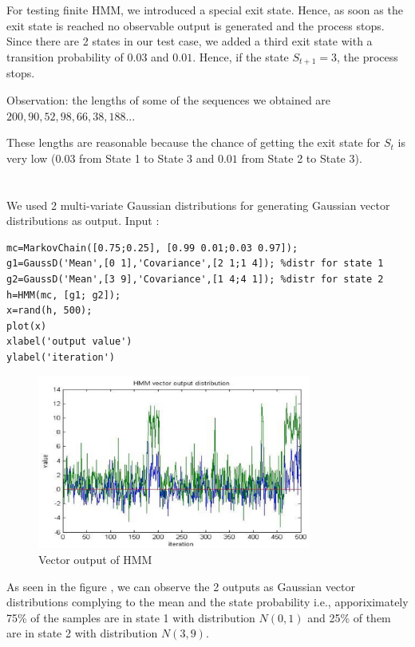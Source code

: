 \section{} %
For testing finite HMM, we introduced a special exit state. Hence, as soon as the exit state is reached no observable output is generated and the process stops. Since there are 2 states in our test case, we added a third exit state with a transition probability of $0.03$ and $0.01$. Hence, if the state $S_{t+1} = 3$, the process stops.

Observation: the lengths of some of the sequences we obtained are $200, 90, 52, 98, 66, 38, 188$...

These lengths are reasonable because the chance of getting the exit state for $S_t$ is very low ($0.03$ from State 1 to State 3 and $0.01$ from State 2 to State 3).

\section{} %
We used 2 multi-variate Gaussian distributions for generating Gaussian vector distributions as output.
Input :
\begin{verbatim}
mc=MarkovChain([0.75;0.25], [0.99 0.01;0.03 0.97]);
g1=GaussD('Mean',[0 1],'Covariance',[2 1;1 4]); %distr for state 1
g2=GaussD('Mean',[3 9],'Covariance',[1 4;4 1]); %distr for state 2
h=HMM(mc, [g1; g2]);
x=rand(h, 500);
plot(x)
xlabel('output value')
ylabel('iteration')
\end{verbatim}

\begin{figure}[H]
	\caption{Vector output of HMM}
	\label{fig:question_7_double_values}
	\centering
	\includegraphics[width=9cm]{images/question_7_double_values}
\end{figure}

As seen in the figure , we can observe the 2 outputs as Gaussian vector distributions complying to the mean and the state probability i.e., apporiximately 75\% of the samples are in state 1 with distribution $N(0,1)$ and 25\% of them are in state 2 with distribution $N(3,9)$.